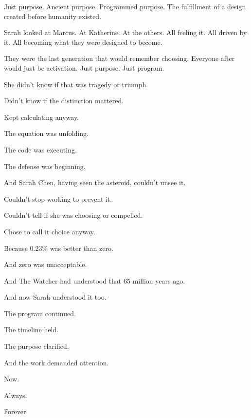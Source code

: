 Just purpose. Ancient purpose. Programmed purpose. The fulfillment of a design created before humanity existed.

Sarah looked at Marcus. At Katherine. At the others. All feeling it. All driven by it. All becoming what they were designed to become.

They were the last generation that would remember choosing. Everyone after would just be activation. Just purpose. Just program.

She didn't know if that was tragedy or triumph.

Didn't know if the distinction mattered.

Kept calculating anyway.

The equation was unfolding.

The code was executing.

The defense was beginning.

And Sarah Chen, having seen the asteroid, couldn't unsee it.

Couldn't stop working to prevent it.

Couldn't tell if she was choosing or compelled.

Chose to call it choice anyway.

Because 0.23\% was better than zero.

And zero was unacceptable.

And The Watcher had understood that 65 million years ago.

And now Sarah understood it too.

The program continued.

The timeline held.

The purpose clarified.

And the work demanded attention.

Now.

Always.

Forever.

